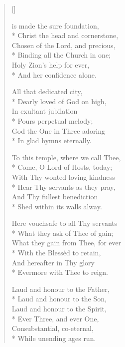 \newHymn

\settowidth{\versewidth}{Christ the head and cornerstone,}
\begin{verse}[\versewidth]

 is made the sure foundation,\\*
Christ the head and cornerstone,\\
Chosen of the Lord, and precious,\\*
Binding all the Church in one;\\
Holy Zion's help for ever,\\*
And her confidence alone.

All that dedicated city,\\*
Dearly loved of God on high,\\
In exultant jubilation\\*
Pours perpetual melody;\\
God the One in Three adoring\\*
In glad hymns eternally.

To this temple, where we call Thee,\\*
Come, O Lord of Hosts, today;\\
With Thy wonted loving-kindness\\*
Hear Thy servants as they pray,\\
And Thy fullest benediction\\*
Shed within its walls alway.

Here vouchsafe to all Thy servants\\*
What they ask of Thee of gain;\\
What they gain from Thee, for ever\\*
With the Blessèd to retain,\\
And hereafter in Thy glory\\*
Evermore with Thee to reign.

Laud and honour to the Father,\\*
Laud and honour to the Son,\\
Laud and honour to the Spirit,\\*
Ever Three, and ever One,\\
Consubstantial, co-eternal,\\*
While unending ages run.

\end{verse}




